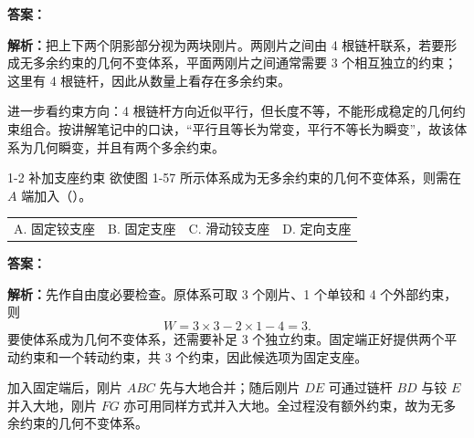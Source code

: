 \begin{solutioncard}
\textbf{答案：}

\textbf{解析：}把上下两个阴影部分视为两块刚片。两刚片之间由 4 根链杆联系，若要形成无多余约束的几何不变体系，平面两刚片之间通常需要 3 个相互独立的约束；这里有 4 根链杆，因此从数量上看存在多余约束。

进一步看约束方向：4 根链杆方向近似平行，但长度不等，不能形成稳定的几何约束组合。按讲解笔记中的口诀，“平行且等长为常变，平行不等长为瞬变”，故该体系为几何瞬变，并且有两个多余约束。
\end{solutioncard}

\begin{problemcard}{1-2 补加支座约束 }
欲使图 1-57 所示体系成为无多余约束的几何不变体系，则需在 \(A\) 端加入（\quad）。

\begin{tabularx}{\textwidth}{@{}XXXX@{}}
A. 固定铰支座 & B. 固定支座 & C. 滑动铰支座 & D. 定向支座
\end{tabularx}

\begin{figure}[H]
\centering
{}
\end{figure}
\end{problemcard}

\begin{solutioncard}
\textbf{答案：}

\textbf{解析：}先作自由度必要检查。原体系可取 3 个刚片、1 个单铰和 4 个外部约束，则
\[
  W=3\times 3-2\times 1-4=3 .
\]
要使体系成为几何不变体系，还需要补足 3 个独立约束。固定端正好提供两个平动约束和一个转动约束，共 3 个约束，因此候选项为固定支座。

加入固定端后，刚片 \(ABC\) 先与大地合并；随后刚片 \(DE\) 可通过链杆 \(BD\) 与铰 \(E\) 并入大地，刚片 \(FG\) 亦可用同样方式并入大地。全过程没有额外约束，故为无多余约束的几何不变体系。
\end{solutioncard}

